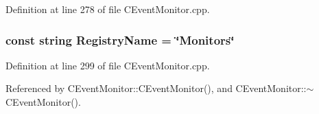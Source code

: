 Definition at line 278 of file CEvent\-Monitor.cpp.
\subsubsection{\setlength{\rightskip}{0pt plus 5cm}const string Registry\-Name = \char`\"{}Monitors\char`\"{}\hspace{0.3cm}{\tt  [static]}}\label{CEventMonitor_8cpp_a1}




Definition at line 299 of file CEvent\-Monitor.cpp.

Referenced by CEvent\-Monitor::CEvent\-Monitor(), and CEvent\-Monitor::$\sim$CEvent\-Monitor().